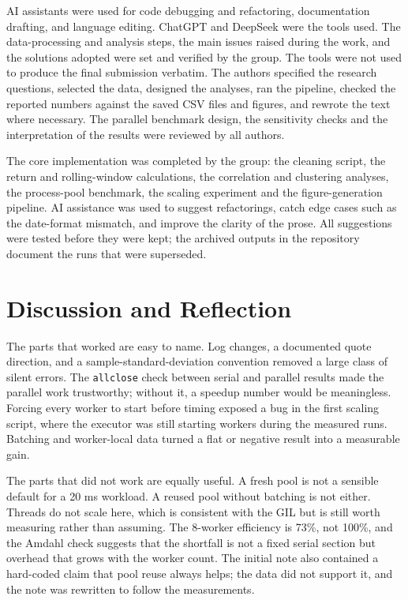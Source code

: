 \documentclass[journal]{IEEEtran}
\begin{document}

AI assistants were used for code debugging and refactoring, documentation drafting, and language editing. ChatGPT and DeepSeek were the tools used. The data-processing and analysis steps, the main issues raised during the work, and the solutions adopted were set and verified by the group. The tools were not used to produce the final submission verbatim. The authors specified the research questions, selected the data, designed the analyses, ran the pipeline, checked the reported numbers against the saved CSV files and figures, and rewrote the text where necessary. The parallel benchmark design, the sensitivity checks and the interpretation of the results were reviewed by all authors.

The core implementation was completed by the group: the cleaning script, the return and rolling-window calculations, the correlation and clustering analyses, the process-pool benchmark, the scaling experiment and the figure-generation pipeline. AI assistance was used to suggest refactorings, catch edge cases such as the date-format mismatch, and improve the clarity of the prose. All suggestions were tested before they were kept; the archived outputs in the repository document the runs that were superseded.

\section{Discussion and Reflection}
\label{sec:discussion}

The parts that worked are easy to name. Log changes, a documented quote direction, and a sample-standard-deviation convention removed a large class of silent errors. The \texttt{allclose} check between serial and parallel results made the parallel work trustworthy; without it, a speedup number would be meaningless. Forcing every worker to start before timing exposed a bug in the first scaling script, where the executor was still starting workers during the measured runs. Batching and worker-local data turned a flat or negative result into a measurable gain.

The parts that did not work are equally useful. A fresh pool is not a sensible default for a 20 ms workload. A reused pool without batching is not either. Threads do not scale here, which is consistent with the GIL but is still worth measuring rather than assuming. The 8-worker efficiency is 73\%, not 100\%, and the Amdahl check suggests that the shortfall is not a fixed serial section but overhead that grows with the worker count. The initial note also contained a hard-coded claim that pool reuse always helps; the data did not support it, and the note was rewritten to follow the measurements.
\end{document}
